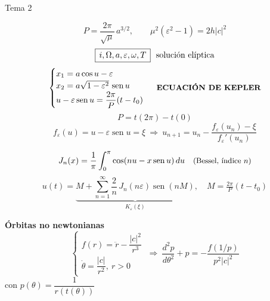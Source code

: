 \documentclass[10pt,a4paper]{extarticle}
\newcommand{\sen}{\operatorname{sen}}
\begin{document}
\begin{bx}{Tema 2}
\vspace{3pt}

\begin{minipage}[t]{0.50\linewidth}
\[P=\frac{2\pi}{\sqrt\mu}\,a^{3/2},\qquad \mu^2(\varepsilon^2-1)=2h|c|^2\]
\[\fbox{$\,i,\Omega,a,\varepsilon,\omega,T\,$}\ \text{ solución elíptica}\]
\[\begin{cases}x_1=a\cos u-\varepsilon\\ x_2=a\sqrt{1-\varepsilon^2}\,\sen u\\ u-\varepsilon\sen u=\dfrac{2\pi}{P}(t-t_0)\end{cases}\ \text{\small\textbf{ECUACIÓN DE KEPLER}}\]
\[P=t(2\pi)-t(0)\]
\[f_\varepsilon(u)=u-\varepsilon\sen u=\xi\ \Rightarrow\ u_{n+1}=u_n-\frac{f_\varepsilon(u_n)-\xi}{f_\varepsilon'(u_n)}\]
\end{minipage}\hfill\vrule\hfill
\begin{minipage}[t]{0.46\linewidth}
\[J_n(x)=\frac1\pi\int_0^\pi\cos(nu-x\sen u)\,du\quad\text{\small (Bessel, índice $n$)}\]
\[u(t)=\underbrace{M+\sum_{n=1}^\infty\frac2n\,J_n(n\varepsilon)\sen(nM)}_{K_\varepsilon(\xi)},\quad M=\tfrac{2\pi}{P}(t-t_0)\]
\begin{key}
\textbf{Órbitas no newtonianas}
\[\begin{cases}f(r)=\ddot r-\dfrac{|c|^2}{r^3}\\[4pt]\dot\theta=\dfrac{|c|}{r^2},\ r>0\end{cases}
\ \Rightarrow\ \frac{d^2p}{d\theta^2}+p=-\frac{f(1/p)}{p^2|c|^2}\]
con $p(\theta)=\dfrac1{r(t(\theta))}$
\end{key}
\end{minipage}
\end{bx}
\end{document}
